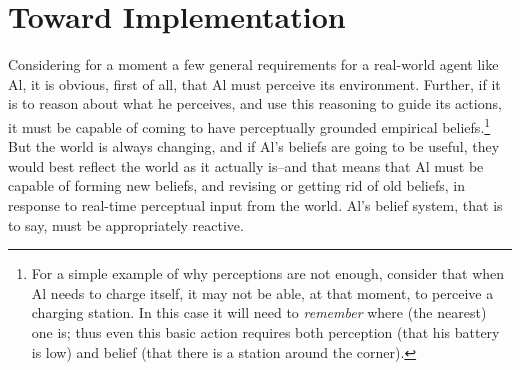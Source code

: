 \documentclass[]{llncs}
\begin{document}
\section{Toward Implementation\label{activelogic}}

%
%
Considering for a moment a few general requirements for a real-world
agent like Al, it is obvious, first of all, that Al must perceive its
environment.  Further, if it is to reason about what he perceives, and
use this reasoning to guide its actions, it must be capable of coming
to have perceptually grounded empirical beliefs.\footnote{For a simple
example of why perceptions are not enough, consider that when Al needs
to charge itself, it may not be able, at that moment, to perceive a
charging station.  In this case it will need to {\em remember} where
(the nearest) one is; thus even this basic action requires both
perception (that his battery is low) and belief (that there is a
station around the corner).}  But the world is always changing, and if
Al's beliefs are going to be useful, they would best reflect
the world as it actually is--and that means that Al must be capable
of forming new beliefs, and revising or getting rid of old beliefs, in
response to real-time perceptual input from the world.  Al's belief
system, that is to say, must be appropriately reactive.
\end{document}
